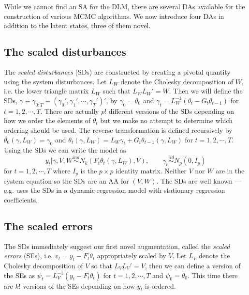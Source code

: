 \documentclass[12pt]{article}
\begin{document}
While we cannot find an SA for the DLM, there are several DAs available for the construction of various MCMC algorithms. We now introduce four DAs in addition to the latent states, three of them novel.

\subsection{The scaled disturbances}\label{sec:DAs:dist}

The {\it scaled disturbances} (SDs) are constructed by creating a pivotal quantity using the system disturbances. Let $L_W$ denote the Cholesky decomposition of $W$, i.e. the lower triangle matrix $L_W$ such that $L_WL_W' =W$. Then we will define the SDs, $\gamma\equiv\gamma_{0:T}\equiv(\gamma_0',\gamma_1',\cdots,\gamma_T')'$, by $\gamma_0=\theta_0$ and $\gamma_t = L_W^{-1}(\theta_t-G_t\theta_{t-1})$ for $t=1,2,\cdots,T$. There are actually $p!$ different versions of the SDs depending on how we order the elements of $\theta_t$ but we make no attempt to determine which ordering should be used. The reverse transformation is defined recursively by $\theta_0(\gamma,L_W)=\gamma_0$ and $\theta_t(\gamma,L_W)=L_W\gamma_t + G_t\theta_{t-1}(\gamma,L_W)$ for $t=1,2,\cdots,T$. Using the SDs we can write the model as \vspace{-.3cm}
\[
  y_t|\gamma,V,W  \stackrel{ind}{\sim} N_k\left(F_t\theta_t(\gamma,L_W), V\right), \qquad \gamma_t  \stackrel{iid}{\sim}N_p(0,I_p) \label{dlmdistmodel}
\]
for $t=1,2,\cdots,T$ where $I_p$ is the $p\times p$ identity matrix. Neither $V$ nor $W$ are in the system equation so the SDs are an AA for $(V,W)$. The SDs are well known --- e.g. \citet{fruhwirth2004efficient} uses the SDs in a dynamic regression model with stationary regression coefficients.

\subsection{The scaled errors}\label{sec:DAs:error}
The SDs immediately suggest our first novel augmentation, called the {\it scaled errors} (SEs), i.e. $v_t=y_t - F_t\theta_t$ appropriately scaled by $V$. Let $L_V$ denote the Cholesky decomposition of $V$ so that $L_VL_V'=V$, then we can define a version of the SEs as $\psi_t = L_V^{-1}(y_t - F_t\theta_t)$ for $t=1,2,\cdots,T$ and $\psi_0 = \theta_0$. This time there are $k!$ versions of the SEs depending on how $y_t$ is ordered.
\end{document}
